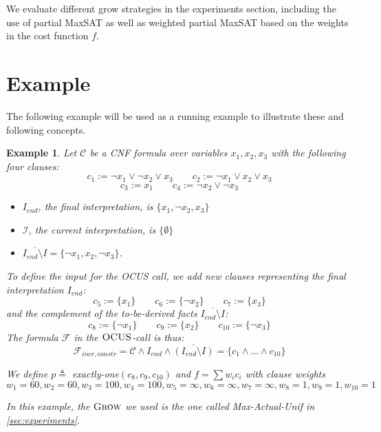\documentclass[twoside,11pt]{article}
\newcommand\m[1]{\mathcal{#1}}
\newtheorem{example}[ex]{Example}
\newcommand\Iend{\ensuremath{I_\mathit{end} }\xspace}
\newcommand\formula{\ensuremath{\m{F} }\xspace}
\newcommand\formulac{\ensuremath{\m{C} }\xspace}
\newcommand\mm[1]{\ensuremath{#1}\xspace}
\newcommand\call[1]{\mm{\textsc{#1}}}
\newcommand\grow{\mm{\call{Grow}}}
\newcommand\comus{\mm{\call{OCUS}}}
\newcommand\maxsat{MaxSAT\xspace}
\begin{document}
We evaluate different grow strategies in the experiments section, including the use of partial \maxsat as well as weighted partial \maxsat based on the weights in the cost function $f$.

\section{Example}
The following example will be used as a running example to illustrate these and following concepts.

\begin{example}
Let $\formulac$ be a CNF formula over variables $x_1, x_2, x_3$ with the following four clauses:
\[ c_1 := \lnot x_1 \vee \lnot x_2 \vee x_3 \qquad  c_2 := \lnot x_1 \vee  x_2 \vee x_3\] \[  c_3 := x_1 \qquad c_4 := \lnot x_2 \vee \lnot x_3 \]
		
\begin{itemize}
	\item $\Iend$, the final interpretation, is $\{x_1, \lnot x_2,  x_3\}$
	\item $\m{I}$, the current interpretation, is $\{ \emptyset \}$
	\item $\overline{\Iend\setminus I} =  \{\lnot x_1, x_2, \lnot x_3\}$.
\end{itemize}
To define the input for the OCUS call, we add new clauses representing the final interpretation $\Iend$:
\[ c_5 := \{ x_1\}\qquad  c_6:=\{\lnot x_2\} \qquad  c_7 := \{ x_3\}\]
and the complement of the to-be-derived facts $\overline{\Iend\setminus I}$: 
\[ c_8 := \{\lnot x_1\}\qquad  c_9:=\{x_2\} \qquad  c_{10} := \{\lnot x_3\}\]
The formula \formula in the \comus-call is thus: 
\[\formula_{incr, constr}= \formulac\land \Iend \land \overline{(\Iend\setminus I)} = \{ c_1 \wedge ... \wedge c_{10}\}\]	
		
We define $p\triangleq$ \textit{exactly-one$(c_8, c_9, c_{10})$} and $f = \sum w_ic_i$ with clause weights \[w_1 = 60, w_2=60, w_3=100, w_4=100, w_5=\infty, w_6=\infty, w_7=\infty, w_8=1, w_9=1, w_{10}=1\]
		
\emph{In this example, the \grow we used is the one called \emph{Max-Actual-Unif} in \cref{sec:experiments}.}
\end{example}
\end{document}
